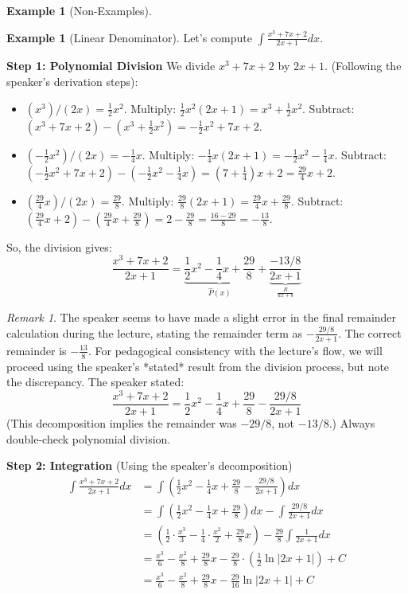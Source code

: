\documentclass[11pt]{article}
\theoremstyle{plain}
\theoremstyle{definition}
\newtheorem{example}[theorem]{Example}
\theoremstyle{remark}
\newtheorem{remark}[theorem]{Remark}
\newcommand{\abs}[1]{\left|#1\right|}
\begin{document}
\begin{example}[Non-Examples]
\begin{example}[Linear Denominator]
Let's compute $\int \frac{x^3 + 7x + 2}{2x+1} dx$.

\textbf{Step 1: Polynomial Division}
We divide $x^3 + 7x + 2$ by $2x+1$.
(Following the speaker's derivation steps):
\begin{itemize}
    \item $(x^3) / (2x) = \frac{1}{2}x^2$. Multiply: $\frac{1}{2}x^2 (2x+1) = x^3 + \frac{1}{2}x^2$. Subtract: $(x^3+7x+2) - (x^3+\frac{1}{2}x^2) = -\frac{1}{2}x^2 + 7x + 2$.
    \item $(-\frac{1}{2}x^2) / (2x) = -\frac{1}{4}x$. Multiply: $-\frac{1}{4}x(2x+1) = -\frac{1}{2}x^2 - \frac{1}{4}x$. Subtract: $(-\frac{1}{2}x^2+7x+2) - (-\frac{1}{2}x^2 - \frac{1}{4}x) = (7+\frac{1}{4})x + 2 = \frac{29}{4}x + 2$.
    \item $(\frac{29}{4}x) / (2x) = \frac{29}{8}$. Multiply: $\frac{29}{8}(2x+1) = \frac{29}{4}x + \frac{29}{8}$. Subtract: $(\frac{29}{4}x+2) - (\frac{29}{4}x + \frac{29}{8}) = 2 - \frac{29}{8} = \frac{16-29}{8} = -\frac{13}{8}$.
\end{itemize}
So, the division gives:
\[ \frac{x^3 + 7x + 2}{2x+1} = \underbrace{\frac{1}{2}x^2 - \frac{1}{4}x + \frac{29}{8}}_{\hat{P}(x)} + \underbrace{\frac{-13/8}{2x+1}}_{\frac{R}{ax+b}} \]
\begin{remark}
The speaker seems to have made a slight error in the final remainder calculation during the lecture, stating the remainder term as $-\frac{29/8}{2x+1}$. The correct remainder is $-\frac{13}{8}$. For pedagogical consistency with the lecture's flow, we will proceed using the speaker's *stated* result from the division process, but note the discrepancy. The speaker stated:
\[ \frac{x^3 + 7x + 2}{2x+1} = \frac{1}{2}x^2 - \frac{1}{4}x + \frac{29}{8} - \frac{29/8}{2x+1} \]
(This decomposition implies the remainder was $-29/8$, not $-13/8$.) Always double-check polynomial division.
\end{remark}

\textbf{Step 2: Integration} (Using the speaker's decomposition)
\begin{align*} \int \frac{x^3 + 7x + 2}{2x+1} dx &= \int \left( \frac{1}{2}x^2 - \frac{1}{4}x + \frac{29}{8} - \frac{29/8}{2x+1} \right) dx \\ &= \int \left( \frac{1}{2}x^2 - \frac{1}{4}x + \frac{29}{8} \right) dx - \int \frac{29/8}{2x+1} dx \\ &= \left( \frac{1}{2} \cdot \frac{x^3}{3} - \frac{1}{4} \cdot \frac{x^2}{2} + \frac{29}{8}x \right) - \frac{29}{8} \int \frac{1}{2x+1} dx \\ &= \frac{x^3}{6} - \frac{x^2}{8} + \frac{29}{8}x - \frac{29}{8} \cdot \left( \frac{1}{2} \ln\abs{2x+1} \right) + C \\ &= \frac{x^3}{6} - \frac{x^2}{8} + \frac{29}{8}x - \frac{29}{16} \ln\abs{2x+1} + C \end{align*}
\end{example}


\end{example}
\end{document}
